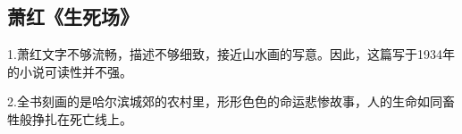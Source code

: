 \subsection{萧红《生死场》}
1.萧红文字不够流畅，描述不够细致，接近山水画的写意。因此，这篇写于1934年的小说可读性并不强。

2.全书刻画的是哈尔滨城郊的农村里，形形色色的命运悲惨故事，人的生命如同畜牲般挣扎在死亡线上。